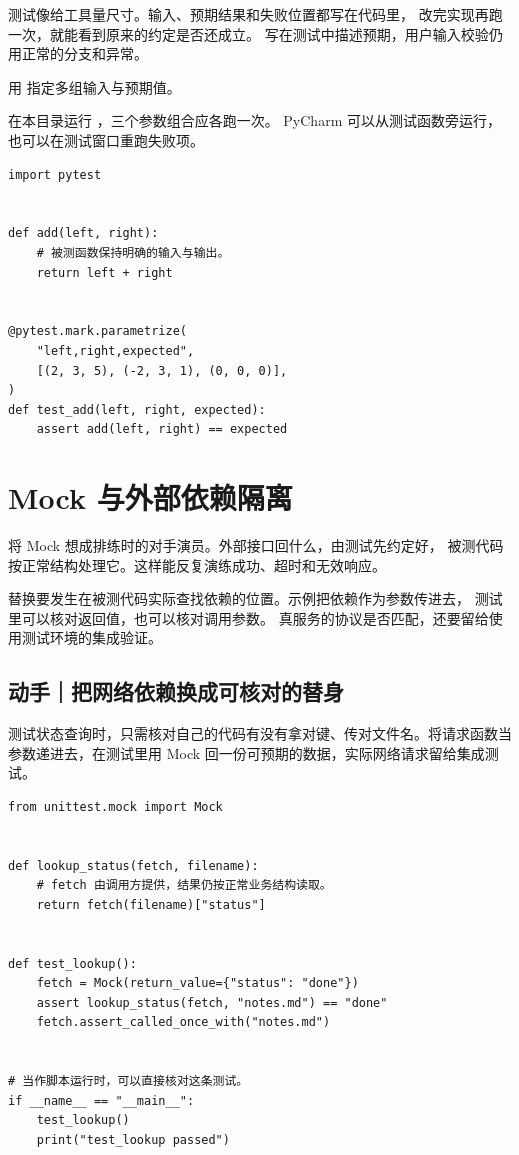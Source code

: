 测试像给工具量尺寸。输入、预期结果和失败位置都写在代码里，
改完实现再跑一次，就能看到原来的约定是否还成立。
 写在测试中描述预期，用户输入校验仍用正常的分支和异常。

用  指定多组输入与预期值。

在本目录运行 ，三个参数组合应各跑一次。
PyCharm 可以从测试函数旁运行，也可以在测试窗口重跑失败项。


\begin{lstlisting}[title={\code{test_add_cases.py}}]
import pytest


def add(left, right):
    # 被测函数保持明确的输入与输出。
    return left + right


@pytest.mark.parametrize(
    "left,right,expected",
    [(2, 3, 5), (-2, 3, 1), (0, 0, 0)],
)
def test_add(left, right, expected):
    assert add(left, right) == expected
\end{lstlisting}


\section{Mock 与外部依赖隔离}

将 Mock 想成排练时的对手演员。外部接口回什么，由测试先约定好，
被测代码按正常结构处理它。这样能反复演练成功、超时和无效响应。

替换要发生在被测代码实际查找依赖的位置。示例把依赖作为参数传进去，
测试里可以核对返回值，也可以核对调用参数。
真服务的协议是否匹配，还要留给使用测试环境的集成验证。

\subsection*{动手｜把网络依赖换成可核对的替身}

测试状态查询时，只需核对自己的代码有没有拿对键、传对文件名。将请求函数当参数递进去，在测试里用 Mock 回一份可预期的数据，实际网络请求留给集成测试。

\begin{lstlisting}[title={\code{test_lookup.py}}]
from unittest.mock import Mock


def lookup_status(fetch, filename):
    # fetch 由调用方提供，结果仍按正常业务结构读取。
    return fetch(filename)["status"]


def test_lookup():
    fetch = Mock(return_value={"status": "done"})
    assert lookup_status(fetch, "notes.md") == "done"
    fetch.assert_called_once_with("notes.md")


# 当作脚本运行时，可以直接核对这条测试。
if __name__ == "__main__":
    test_lookup()
    print("test_lookup passed")
\end{lstlisting}

